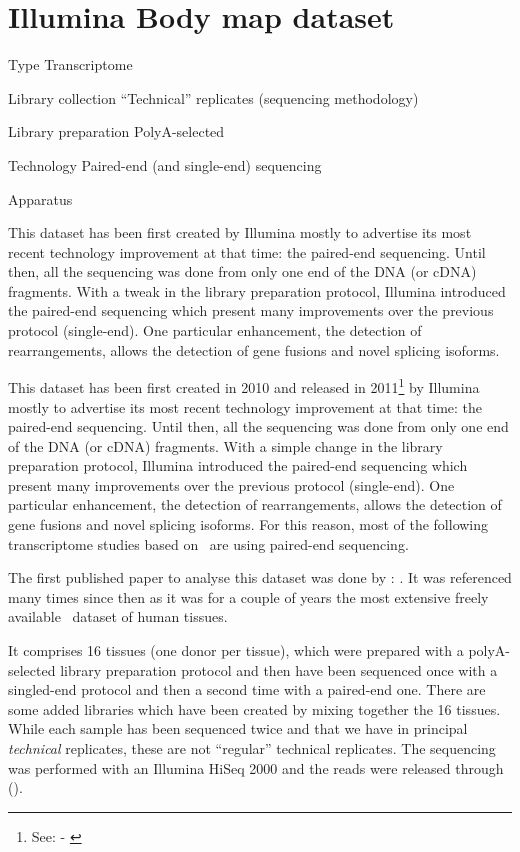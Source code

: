 \chapter{Illumina Body map dataset}
\label{ch:IBMData}

\begin{eqlist}
    \item[Type] Transcriptome
    \item[Library collection] ``Technical'' replicates (sequencing methodology)
    \item[Library preparation] PolyA-selected
    \item[Technology] Paired-end (and single-end) sequencing
    \item[Apparatus]
\end{eqlist}

This dataset has been first created by Illumina mostly to advertise its most
recent technology improvement at that time: the paired-end sequencing.  Until
then, all the sequencing was done from only one end of the \gls{DNA} (or
\gls{cDNA}) fragments. With a tweak in the library preparation protocol, Illumina
introduced the paired-end sequencing which present many improvements over the
previous protocol (single-end). One particular enhancement, the detection of
rearrangements, allows the detection of gene fusions and novel splicing isoforms.


This dataset has been first created in 2010 and released in
2011\footnote{See:  - \cite{ibmEnsembl}} by Illumina
mostly to advertise its most recent technology improvement at that time:
the paired-end sequencing.
Until then, all the sequencing was done from only one end of the \gls{DNA} (or
\gls{cDNA}) fragments. With a simple change in the library preparation protocol,
Illumina introduced the paired-end sequencing which present many improvements
over the previous protocol (single-end). One particular enhancement, the
detection of rearrangements, allows the detection of gene fusions and
novel splicing isoforms. For this reason, most of the following transcriptome
studies based on \Rnaseq\ are using paired-end sequencing.

The first published paper to analyse this dataset was done by
\citet{ibmrelatedpaper}: .
It was referenced many times since then as it was for a couple of years
the most extensive freely available \Rnaseq\ dataset of human tissues.

It comprises 16 tissues (one donor per tissue), which were prepared with a
polyA-selected library preparation protocol and then have been sequenced once
with a singled-end protocol and then a second time with a paired-end one. There
are some added libraries which have been created by mixing together the 16 tissues.
While each sample has been sequenced twice and that we have in principal
\emph{technical} replicates, these are not ``regular'' technical
replicates.
The sequencing was performed with an Illumina HiSeq 2000 and the reads were
released through  ().

